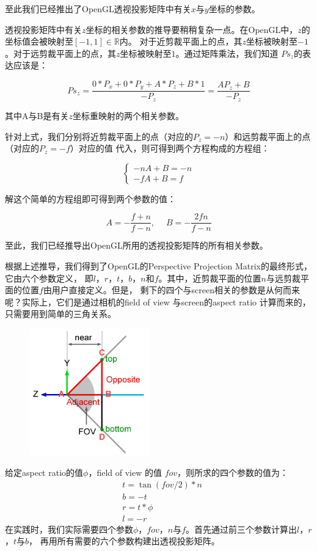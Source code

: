\documentclass[12pt]{article}
\begin{document}
\noindent{}至此我们已经推出了OpenGL透视投影矩阵中有关$x$与$y$坐标的参数。

\indent{}透视投影矩阵中有关$z$坐标的相关参数的推导要稍稍复杂一点。在OpenGL中，$z$的坐标值会被映射至$[-1,1]\in\mathbb{R}$内。
对于近剪裁平面上的点，其$z$坐标被映射至$-1$。对于远剪裁平面上的点，其$z$坐标被映射至$1$。通过矩阵乘法，我们知道
$Ps_z$的表达应该是：

\begin{displaymath}
Ps_z = \frac{0*P_x + 0 * P_y + A * P_z + B * 1}{-P_z} = \frac{AP_z + B}{-P_z}
\end{displaymath}

\noindent{}其中A与B是有关$z$坐标重映射的两个相关参数。

\indent{}针对上式，我们分别将近剪裁平面上的点（对应的$P_z=-n$）和远剪裁平面上的点（对应的$P_z=-f$）对应的值
代入，则可得到两个方程构成的方程组：

\begin{displaymath}
\left\{ \begin{array}{ll} {-nA + B} = -n\\
{-fA + B} = f \end{array} \right.
\end{displaymath}

\noindent{}解这个简单的方程组即可得到两个参数的值：

\begin{displaymath}
A = -\frac{f+n}{f-n}, \quad\; B = -\frac{2fn}{f-n}
\end{displaymath}

\noindent{}至此，我们已经推导出OpenGL所用的透视投影矩阵的所有相关参数。

\indent{}根据上述推导，我们得到了OpenGL的Perspective Projection Matrix的最终形式，它由六个参数定义，
即$l$，$r$，$t$，$b$，$n$和$f$。其中，近剪裁平面的位置$n$与远剪裁平面的位置$f$由用户直接定义。但是，
剩下的四个与screen相关的参数是从何而来呢？实际上，它们是通过相机的field of view 与screen的aspect ratio
计算而来的，只需要用到简单的三角关系。

\begin{figure}[h]
\centering
\includegraphics[width=5.2cm]{./imgs/openglsetup.png}
\end{figure}

\noindent{}给定aspect ratio的值$\phi$，field of view 的值 $fov$，则所求的四个参数的值为：
\begin{align*}
&t = \tan(fov/2) * n\\
&b = -t\\
&r = t * \phi\\
&l = -r
\end{align*}
\indent{}在实践时，我们实际需要四个参数$\phi$，$fov$，$n$与$f$。首先通过前三个参数计算出$l$，$r$，$t$与$b$，
再用所有需要的六个参数构建出透视投影矩阵。
\end{document}

